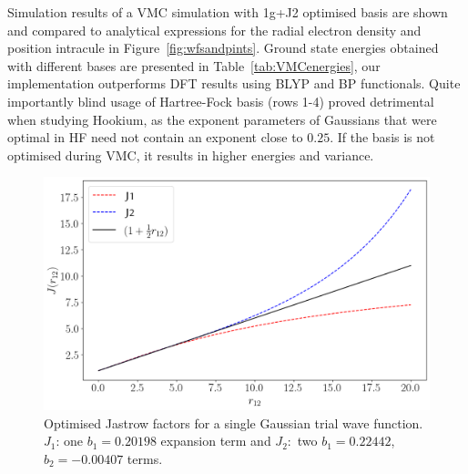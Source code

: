 \documentclass[final,3p,times,twocolumn]{elsarticle}
\begin{document}
	Simulation results of a VMC simulation with 1g+J2 optimised basis are shown and compared to analytical expressions for the radial electron density and position intracule in Figure~\ref{fig:wfsandpints}. Ground state energies obtained with different bases are presented in Table~\ref{tab:VMCenergies}, our implementation outperforms DFT results using BLYP and BP functionals. Quite importantly blind usage of Hartree-Fock basis (rows 1-4) proved detrimental when studying Hookium, as the exponent parameters of Gaussians that were optimal in HF need not contain an exponent close to $0.25$. If the basis is not optimised during VMC, it results in higher energies and variance.
	\begin{figure}[h]
		\centering
		\includegraphics[width=\linewidth]{../plots/jastopt.png}
		\caption{Optimised Jastrow factors for a single Gaussian trial wave function. $J_1$: one $b_{1} = 0.20198$ expansion term and $J_2:$ two $b_1 = 0.22442$, $b_2=-0.00407$ terms.}
		\label{fig:jast-optim}
	\end{figure}
\end{document}

